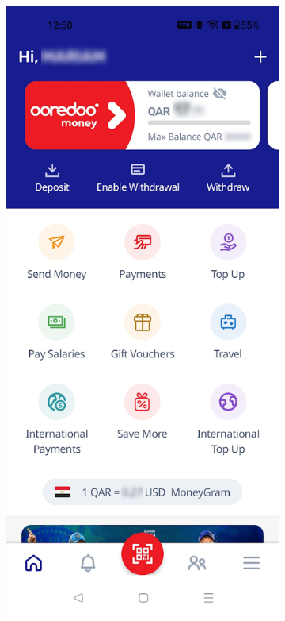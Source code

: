 \begin{figure}[!htb]
    \centering
    \begin{subfigure}[b]{0.32\textwidth}
        \centering
        \includegraphics[width=\textwidth]{images/ooredoo_money_screenshot_1.png}

\end{subfigure}
\end{figure}
